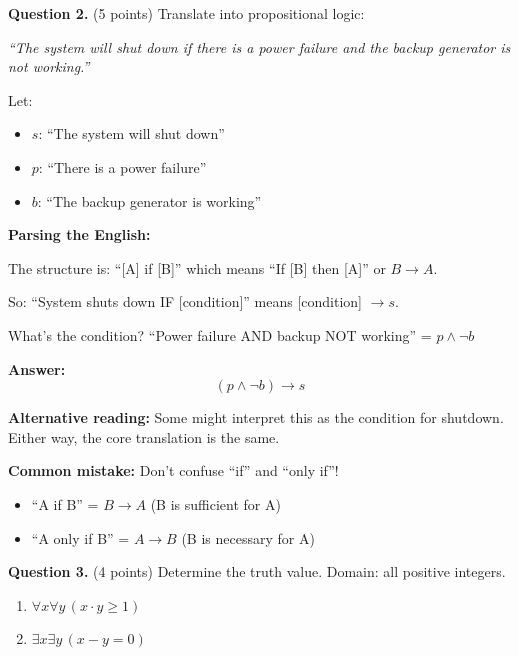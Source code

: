 \documentclass[11pt,a4paper]{article}
\begin{document}
\vspace{15pt}

\textbf{Question 2.} (5 points) Translate into propositional logic:

\textit{``The system will shut down if there is a power failure and the backup generator is not working.''}

Let:
\begin{itemize}[noitemsep]
    \item $s$: ``The system will shut down''
    \item $p$: ``There is a power failure''
    \item $b$: ``The backup generator is working''
\end{itemize}

\begin{solnbox}
\textbf{Parsing the English:}

The structure is: ``[A] if [B]'' which means ``If [B] then [A]'' or $B \to A$.

So: ``System shuts down IF [condition]'' means [condition] $\to s$.

What's the condition? ``Power failure AND backup NOT working'' = $p \land \neg b$

\textbf{Answer:}
$$\boxed{(p \land \neg b) \to s}$$

\textbf{Alternative reading:} Some might interpret this as the condition for shutdown. Either way, the core translation is the same.

\textbf{Common mistake:} Don't confuse ``if'' and ``only if''!
\begin{itemize}[noitemsep]
    \item ``A if B'' = $B \to A$ (B is sufficient for A)
    \item ``A only if B'' = $A \to B$ (B is necessary for A)
\end{itemize}
\end{solnbox}

\vspace{15pt}

\textbf{Question 3.} (4 points) Determine the truth value. Domain: all positive integers.

\begin{enumerate}[label=(\roman*)]
    \item $\forall x \forall y\, (x \cdot y \geq 1)$
    \item $\exists x \exists y\, (x - y = 0)$
\end{enumerate}
\end{document}
